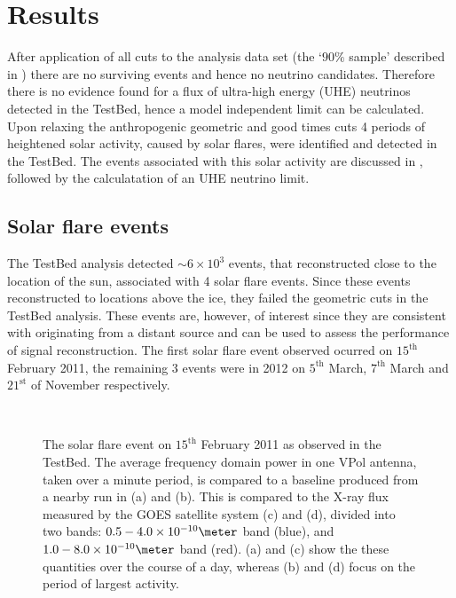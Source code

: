 \chapter{Results}
\label{chap:Results}

After application of all cuts to the analysis data set (the `$90 \%$ sample' described in ) there are no surviving events and hence no neutrino candidates. Therefore there is no evidence found for a flux of ultra-high energy (UHE) neutrinos detected in the TestBed, hence a model independent limit can be calculated. Upon relaxing the anthropogenic geometric and good times cuts 4 periods of heightened solar activity, caused by solar flares, were identified and detected in the TestBed. The events associated with this solar activity are discussed in , followed by the calculatation of an UHE neutrino limit.


\section{Solar flare events}
\label{sec:Results:Solar-Flare}

The TestBed analysis detected $\sim 6 \times 10^{3}$ events, that reconstructed close to the location of the sun, associated with 4 solar flare events. Since these events reconstructed to locations above the ice, they failed the geometric cuts in the TestBed analysis. These events are, however, of interest since they are consistent with originating from a distant source and can be used to assess the performance of signal reconstruction. The first solar flare event observed ocurred on $15^{\mbox{th}}$ February 2011, the remaining 3 events were in 2012 on $5^{\mbox{th}}$ March, $7^{\mbox{th}}$ March and $21^{\mbox{st}}$ of November respectively.



\begin{figure} [htpb]
  \hfill
  \\
  \hfill
  \caption{The solar flare event on $15^{\mbox{th}}$ February 2011 as observed in the TestBed. The average frequency domain power in one VPol antenna, taken over a minute period, is compared to a baseline produced from a nearby run in (a) and (b). This is compared to the X-ray flux measured by the GOES satellite system \cite{2009SPIE.7438E...1C} (c) and (d), divided into two bands: $0.5 - 4.0 \times 10^{-10} \meter$ band (blue), and $1.0 - 8.0 \times 10^{-10} \meter$ band (red). (a) and (c) show the these quantities over the course of a day, whereas (b) and (d) focus on the period of largest activity.}  
  \label{fig:Results:Solar-Flare:Frequency}
\end{figure}

